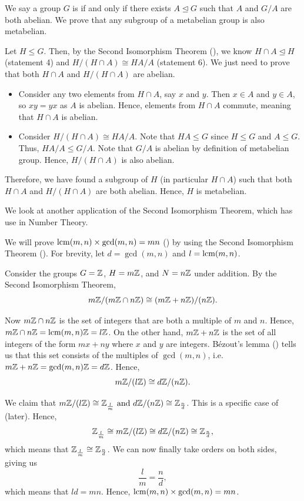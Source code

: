\begin{example}
    We say a group $G$ is  if and only if there exists $A \unlhd G$ such that $A$ and $G/A$ are both abelian. We prove that any subgroup of a metabelian group is also metabelian.

    Let $H \leq G$. Then, by the Second Isomorphism Theorem (), we know $H \cap A \unlhd H$ (statement 4) and $H/(H \cap A) \cong HA / A$ (statement 6). We just need to prove that both $H \cap A$ and $H/(H \cap A)$ are abelian.
    \begin{itemize}
        \item Consider any two elements from $H \cap A$, say $x$ and $y$. Then $x \in A$ and $y \in A$, so $xy = yx$ as $A$ is abelian. Hence, elements from $H \cap A$ commute, meaning that $H \cap A$ is abelian.
        \item Consider $H/(H\cap A) \cong HA / A$. Note that $HA \leq G$ since $H \leq G$ and $A \leq G$. Thus, $HA / A \leq G / A$. Note that $G/A$ is abelian by definition of metabelian group. Hence, $H/(H \cap A)$ is also abelian.
    \end{itemize}
    Therefore, we have found a subgroup of $H$ (in particular $H \cap A$) such that both $H \cap A$ and $H/(H\cap A)$ are both abelian. Hence, $H$ is metabelian.
\end{example}

We look at another application of the Second Isomorphism Theorem, which has use in Number Theory.
\begin{example}
    We will prove $\mathrm{lcm}(m,n)\times\gcd(m,n) = mn$ () by using the Second Isomorphism Theorem (). For brevity, let $d = \gcd(m,n)$ and $l = \mathrm{lcm}(m,n)$.

    Consider the groups $G = \mathbb{Z}$, $H = m\mathbb{Z}$, and $N = n\mathbb{Z}$ under addition. By the Second Isomorphism Theorem,
    \[
        m\mathbb{Z}/(m\mathbb{Z} \cap n\mathbb{Z}) \cong (m\mathbb{Z} + n\mathbb{Z})/(n\mathbb{Z}).
    \]

    Now $m\mathbb{Z} \cap n\mathbb{Z}$ is the set of integers that are both a multiple of $m$ and $n$. Hence, $m\mathbb{Z} \cap n\mathbb{Z} = \mathrm{lcm}(m,n)\mathbb{Z} = l\mathbb{Z}$. On the other hand, $m\mathbb{Z} + n\mathbb{Z}$ is the set of all integers of the form $mx+ny$ where $x$ and $y$ are integers. B\'{e}zout's lemma () tells us that this set consists of the multiples of $\gcd(m,n)$, i.e. $m\mathbb{Z} + n\mathbb{Z} = \gcd(m,n)\mathbb{Z} = d\mathbb{Z}$. Hence,
    \[
        m\mathbb{Z}/(l\mathbb{Z}) \cong d\mathbb{Z}/(n\mathbb{Z}).
    \]

    We claim that $m\mathbb{Z} / (l\mathbb{Z}) \cong \mathbb{Z}_{\frac lm} \text{ and } d\mathbb{Z} / (n\mathbb{Z}) \cong \mathbb{Z}_{\frac nd}$. This is a specific case of  (later). Hence,
    \[
    \mathbb{Z}_{\frac lm} \cong m\mathbb{Z}/(l\mathbb{Z}) \cong d\mathbb{Z}/(n\mathbb{Z}) \cong \mathbb{Z}_{\frac nd},
    \]
    which means that $\mathbb{Z}_{\frac lm} \cong \mathbb{Z}_{\frac nd}$. We can now finally take orders on both sides, giving us
    \[
        \frac{l}{m} = \frac{n}{d},
    \]
    which means that $ld = mn$. Hence, $\mathrm{lcm}(m,n)\times\gcd(m,n) = mn$.
\end{example}

